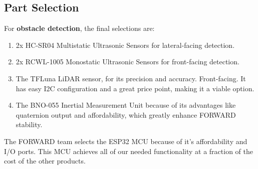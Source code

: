 \subsection{Part Selection}

\noindent For \textbf{obstacle detection}, the final selections are:
\begin{enumerate}
	\item 2x HC-SR04 Multistatic Ultrasonic Sensors for lateral-facing detection.
	\item 2x RCWL-1005 Monostatic Ultrasonic Sensors for front-facing detection.
	\item The TFLuna LiDAR sensor, for its precision and accuracy. Front-facing. It has easy I2C configuration and a great price point, making it a viable option.
	\item The BNO-055 Inertial Measurement Unit because of its advantages like quaternion output and affordability, which greatly enhance FORWARD stability.
\end{enumerate}

\begin{table}[H]
	\centering
	\setlength{\tabcolsep}{5pt} %
	\renewcommand{\arraystretch}{1.75} %
	\caption{\label{fig:mcuComparison}Comparison of MCU Options}
\end{table}

\noindent The FORWARD team selects the ESP32 MCU because of it's affordability and I/O ports. This MCU achieves all of our needed functionality at a fraction of the cost of the other products. \\

